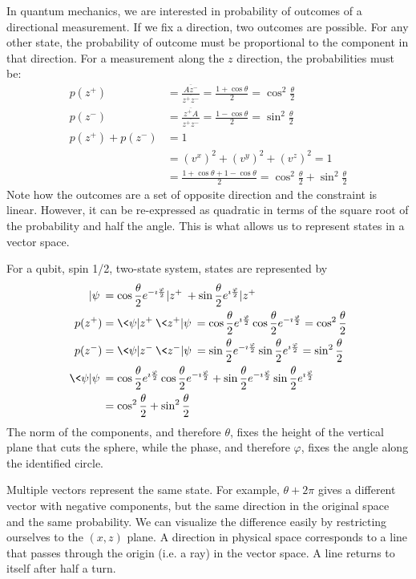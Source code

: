 \documentclass{techbrief}
\begin{document}
In quantum mechanics, we are interested in probability of outcomes of a directional measurement. If we fix a direction, two outcomes are possible. For any other state, the probability of outcome must be proportional to the component in that direction. For a measurement along the $z$ direction, the probabilities must be:
\begin{equation}
	\begin{aligned}
		p(z^+) &= \frac{\overline{A z^-}}{\overline{z^+ z^-}} = \frac{1+\cos \theta}{2} = \cos^2 \frac{\theta}{2} \\
		p(z^-) &= \frac{\overline{z^+ A}}{\overline{z^+ z^-}} = \frac{1-\cos \theta}{2} = \sin^2 \frac{\theta}{2} \\
		p(z^+) + p(z^-)&= 1 \\
		&= (v^x)^2 + (v^y)^2 + (v^z)^2 = 1 \\
		&= \frac{1+\cos \theta + 1-\cos \theta}{2} = \cos^2 \frac{\theta}{2} + \sin^2 \frac{\theta}{2}
	\end{aligned}
\end{equation}
Note how the outcomes are a set of opposite direction and the constraint is linear. However, it can be re-expressed as quadratic in terms of the square root of the probability and half the angle. This is what allows us to represent states in a vector space.

For a qubit, spin 1/2, two-state system, states are represented by
\begin{equation}
	\begin{aligned}
		| \psi \> &= \cos \frac{\theta}{2} e^{-\imath \frac{\varphi}{2}} | z^+ \> + \sin \frac{\theta}{2} e^{\imath \frac{\varphi}{2}} | z^+ \> \\
		p(z^+) &= \<\psi | z^+ \> \< z^+ | \psi \> = \cos \frac{\theta}{2} e^{\imath \frac{\varphi}{2}} \cos \frac{\theta}{2} e^{-\imath \frac{\varphi}{2}} = \cos^2 \frac{\theta}{2} \\
	p(z^-) &= \<\psi | z^- \> \< z^- | \psi \> = \sin \frac{\theta}{2} e^{-\imath \frac{\varphi}{2}} \sin \frac{\theta}{2} e^{\imath \frac{\varphi}{2}} = \sin^2 \frac{\theta}{2} \\
		\< \psi | \psi \> &= \cos \frac{\theta}{2} e^{\imath \frac{\varphi}{2}} \cos \frac{\theta}{2} e^{-\imath \frac{\varphi}{2}} + \sin \frac{\theta}{2} e^{-\imath \frac{\varphi}{2}} \sin \frac{\theta}{2} e^{\imath \frac{\varphi}{2}} \\
		&= \cos^2 \frac{\theta}{2} + \sin^2 \frac{\theta}{2} \\
	\end{aligned}
\end{equation}
The norm of the components, and therefore $\theta$, fixes the height of the vertical plane that cuts the sphere, while the phase, and therefore $\varphi$, fixes the angle along the identified circle.

Multiple vectors represent the same state. For example, $\theta + 2\pi$ gives a different vector with negative components, but the same direction in the original space and the same probability. We can visualize the difference easily by restricting ourselves to the $(x,z)$ plane. A direction in physical space corresponds to a line that passes through the origin (i.e. a ray) in the vector space. A line returns to itself after half a turn.
\end{document}

